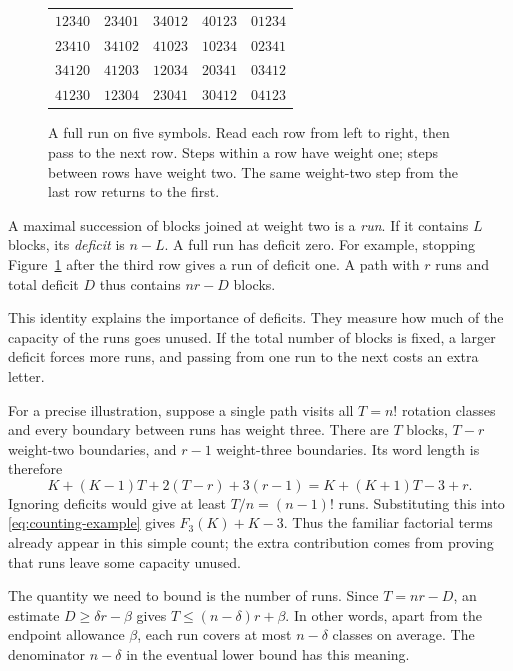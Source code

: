 \begin{figure}[htbp]
\centering
\renewcommand{\arraystretch}{1.25}
\begin{tabular}{ccccc}
$12340$ & $23401$ & $34012$ & $40123$ & $01234$\\
$23410$ & $34102$ & $41023$ & $10234$ & $02341$\\
$34120$ & $41203$ & $12034$ & $20341$ & $03412$\\
$41230$ & $12304$ & $23041$ & $30412$ & $04123$
\end{tabular}
\caption{A full run on five symbols. Read each row from left to right,
then pass to the next row. Steps within a row have weight one; steps
between rows have weight two. The same weight-two step from the last
row returns to the first.}
\label{fig:run}
\end{figure}

A maximal succession of blocks joined at weight two is a \emph{run}.
If it contains $L$ blocks, its \emph{deficit} is $n-L$. A full run has
deficit zero. For example, stopping Figure~\ref{fig:run} after the
third row gives a run of deficit one. A path with $r$ runs and total
deficit $D$ thus contains $nr-D$ blocks.

This identity explains the importance of deficits. They measure how much
of the capacity of the runs goes unused. If the total number of blocks
is fixed, a larger deficit forces more runs, and passing from one run
to the next costs an extra letter.

For a precise illustration, suppose a single path visits all $T=n!$
rotation classes and every boundary between runs has weight three.
There are $T$ blocks, $T-r$ weight-two boundaries, and $r-1$ weight-three
boundaries. Its word length is therefore
\begin{equation}\label{eq:counting-example}
 K+(K-1)T+2(T-r)+3(r-1)=K+(K+1)T-3+r.
\end{equation}
Ignoring deficits would give at least $T/n=(n-1)!$ runs. Substituting
this into \eqref{eq:counting-example} gives $F_3(K)+K-3$. Thus the
familiar factorial terms already appear in this simple count; the extra
contribution comes from proving that runs leave some capacity unused.

The quantity we need to bound is the number of runs. Since
$T=nr-D$, an estimate $D\ge\delta r-\beta$ gives
$T\le(n-\delta)r+\beta$. In other words, apart from the endpoint
allowance $\beta$, each run covers at most $n-\delta$ classes on average.
The denominator $n-\delta$ in the eventual lower bound has this meaning.

